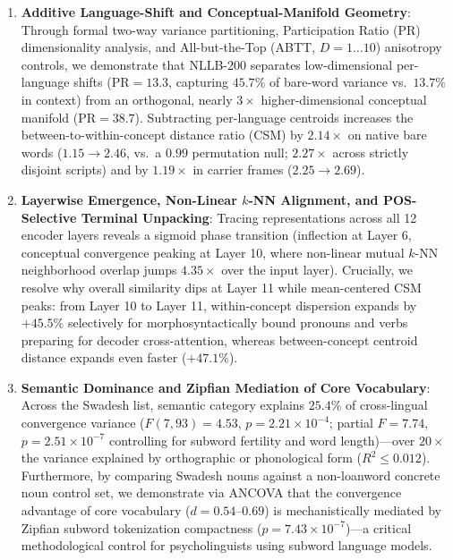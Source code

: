 \documentclass[11pt,a4paper]{article}
\begin{document}
\begin{enumerate}
  \item \textbf{Additive Language-Shift and Conceptual-Manifold Geometry}: Through formal two-way variance partitioning, Participation Ratio (PR) dimensionality analysis, and All-but-the-Top (ABTT, $D = 1\dots 10$) anisotropy controls, we demonstrate that NLLB-200 separates low-dimensional per-language shifts ($\text{PR} = 13.3$, capturing $45.7\%$ of bare-word variance vs.\ $13.7\%$ in context) from an orthogonal, nearly $3\times$ higher-dimensional conceptual manifold ($\text{PR} = 38.7$). Subtracting per-language centroids increases the between-to-within-concept distance ratio (CSM) by $2.14\times$ on native bare words ($1.15 \to 2.46$, vs.\ a $0.99$ permutation null; $2.27\times$ across strictly disjoint scripts) and by $1.19\times$ in carrier frames ($2.25 \to 2.69$).
  \item \textbf{Layerwise Emergence, Non-Linear $k$-NN Alignment, and POS-Selective Terminal Unpacking}: Tracing representations across all 12 encoder layers reveals a sigmoid phase transition (inflection at Layer 6, conceptual convergence peaking at Layer 10, where non-linear mutual $k$-NN neighborhood overlap jumps $4.35\times$ over the input layer). Crucially, we resolve why overall similarity dips at Layer 11 while mean-centered CSM peaks: from Layer 10 to Layer 11, within-concept dispersion expands by $+45.5\%$ selectively for morphosyntactically bound pronouns and verbs preparing for decoder cross-attention, whereas between-concept centroid distance expands even faster ($+47.1\%$).
  \item \textbf{Semantic Dominance and Zipfian Mediation of Core Vocabulary}: Across the Swadesh list, semantic category explains $25.4\%$ of cross-lingual convergence variance ($F(7,93) = 4.53$, $p = 2.21 \times 10^{-4}$; partial $F = 7.74$, $p = 2.51 \times 10^{-7}$ controlling for subword fertility and word length)---over $20\times$ the variance explained by orthographic or phonological form ($R^2 \le 0.012$). Furthermore, by comparing Swadesh nouns against a non-loanword concrete noun control set, we demonstrate via ANCOVA that the convergence advantage of core vocabulary ($d = 0.54\text{--}0.69$) is mechanistically mediated by Zipfian subword tokenization compactness ($p = 7.43 \times 10^{-7}$)---a critical methodological control for psycholinguists using subword language models.

\end{enumerate}
\end{document}
